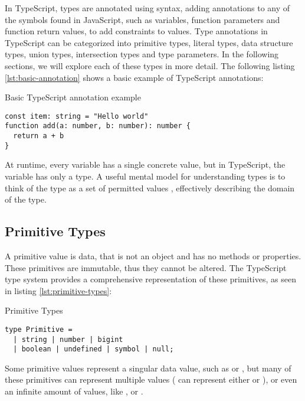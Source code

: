 In TypeScript, types are annotated using  syntax, adding annotations to any of the symbols found in JavaScript, such as variables, function parameters and function return values, to add constraints to values. Type annotations in TypeScript can be categorized into primitive types, literal types, data structure types, union types, intersection types and type parameters. In the following sections, we will explore each of these types in more detail. The following listing \ref{lst:basic-annotation} shows a basic example of TypeScript annotations:

\begin{listing}[ht]
  \caption{Basic TypeScript annotation example}\label{lst:basic-annotation}
  \begin{verbatim}
const item: string = "Hello world"
function add(a: number, b: number): number {
  return a + b
}
\end{verbatim}
\end{listing}

At runtime, every variable has a single concrete value, but in TypeScript, the variable has only a type. A useful mental model for understanding types is to think of the type as a set of permitted values \cite{vanderkamEffectiveTypeScript622019}, effectively describing the domain of the type.

\subsection{Primitive Types}

A primitive value is data, that is not an object and has no methods or properties. These primitives are immutable, thus they cannot be altered. The TypeScript type system provides a comprehensive representation of these primitives, as seen in listing \ref{lst:primitive-types}:

\begin{listing}[ht]
  \caption{Primitive Types}\label{lst:primitive-types}
  \begin{verbatim}
type Primitive = 
  | string | number | bigint
  | boolean | undefined | symbol | null;
\end{verbatim}
\end{listing}

Some primitive values represent a singular data value, such as  or , but many of these primitives can represent multiple values ( can represent either  or ), or even an infinite amount of values, like ,  or .

